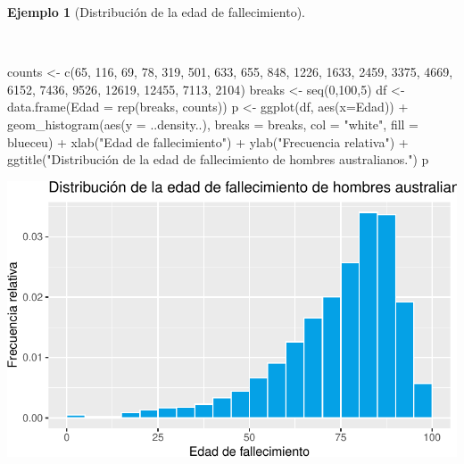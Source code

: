 \documentclass[
  a4paper,
]{scrreport}
\newenvironment{Shaded}{\begin{snugshade}}{\end{snugshade}}
\newcommand{\AttributeTok}[1]{\textcolor[rgb]{0.40,0.45,0.13}{#1}}
\newcommand{\DecValTok}[1]{\textcolor[rgb]{0.68,0.00,0.00}{#1}}
\newcommand{\FunctionTok}[1]{\textcolor[rgb]{0.28,0.35,0.67}{#1}}
\newcommand{\NormalTok}[1]{\textcolor[rgb]{0.00,0.23,0.31}{#1}}
\newcommand{\OtherTok}[1]{\textcolor[rgb]{0.00,0.23,0.31}{#1}}
\newcommand{\SpecialCharTok}[1]{\textcolor[rgb]{0.37,0.37,0.37}{#1}}
\newcommand{\StringTok}[1]{\textcolor[rgb]{0.13,0.47,0.30}{#1}}
\theoremstyle{plain}
\theoremstyle{definition}
\theoremstyle{definition}
\newtheorem{example}{Ejemplo}[chapter]
\theoremstyle{remark}
\begin{document}
\begin{example}[Distribución de la edad de
fallecimiento]\protect\hypertarget{exm-distribucion-edad-fallecimiento}{}\label{exm-distribucion-edad-fallecimiento}

~

\begin{Shaded}
\begin{Highlighting}[]
\NormalTok{counts }\OtherTok{\textless{}{-}} \FunctionTok{c}\NormalTok{(}\DecValTok{65}\NormalTok{, }\DecValTok{116}\NormalTok{, }\DecValTok{69}\NormalTok{, }\DecValTok{78}\NormalTok{, }\DecValTok{319}\NormalTok{, }\DecValTok{501}\NormalTok{, }\DecValTok{633}\NormalTok{, }\DecValTok{655}\NormalTok{, }\DecValTok{848}\NormalTok{, }\DecValTok{1226}\NormalTok{, }\DecValTok{1633}\NormalTok{, }\DecValTok{2459}\NormalTok{, }\DecValTok{3375}\NormalTok{, }\DecValTok{4669}\NormalTok{, }\DecValTok{6152}\NormalTok{, }\DecValTok{7436}\NormalTok{, }\DecValTok{9526}\NormalTok{, }\DecValTok{12619}\NormalTok{, }\DecValTok{12455}\NormalTok{, }\DecValTok{7113}\NormalTok{, }\DecValTok{2104}\NormalTok{)}
\NormalTok{breaks }\OtherTok{\textless{}{-}} \FunctionTok{seq}\NormalTok{(}\DecValTok{0}\NormalTok{,}\DecValTok{100}\NormalTok{,}\DecValTok{5}\NormalTok{)}
\NormalTok{df }\OtherTok{\textless{}{-}} \FunctionTok{data.frame}\NormalTok{(}\AttributeTok{Edad =} \FunctionTok{rep}\NormalTok{(breaks, counts))}
\NormalTok{p }\OtherTok{\textless{}{-}} \FunctionTok{ggplot}\NormalTok{(df, }\FunctionTok{aes}\NormalTok{(}\AttributeTok{x=}\NormalTok{Edad)) }\SpecialCharTok{+}
    \FunctionTok{geom\_histogram}\NormalTok{(}\FunctionTok{aes}\NormalTok{(}\AttributeTok{y =}\NormalTok{ ..density..), }\AttributeTok{breaks =}\NormalTok{ breaks, }\AttributeTok{col =} \StringTok{"white"}\NormalTok{, }\AttributeTok{fill =}\NormalTok{ blueceu) }\SpecialCharTok{+}
    \FunctionTok{xlab}\NormalTok{(}\StringTok{"Edad de fallecimiento"}\NormalTok{) }\SpecialCharTok{+}
    \FunctionTok{ylab}\NormalTok{(}\StringTok{"Frecuencia relativa"}\NormalTok{) }\SpecialCharTok{+}
    \FunctionTok{ggtitle}\NormalTok{(}\StringTok{"Distribución de la edad de fallecimiento de hombres australianos."}\NormalTok{)}
\NormalTok{p}
\end{Highlighting}
\end{Shaded}

\includegraphics{02-estadistica-descriptiva_files/figure-pdf/histograma-edad-fallecimiento-1.pdf}

\end{example}
\end{document}
